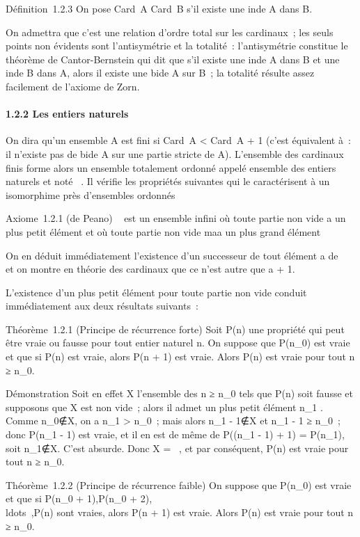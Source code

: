 \documentclass[]{article}
\begin{document}
Définition~1.2.3 On pose Card~A
\leq Card~B s'il existe une in\jmathection de A dans B.

On admettra que c'est une relation d'ordre total sur les cardinaux~; les
seuls points non évidents sont l'antisymétrie et la totalité~:
l'antisymétrie constitue le théorème de Cantor-Bernstein qui dit que
s'il existe une in\jmathection de A dans B et une in\jmathection de B dans A,
alors il existe une bi\jmathection de A sur B~; la totalité résulte assez
facilement de l'axiome de Zorn.

\paragraph{1.2.2 Les entiers naturels}

On dira qu'un ensemble A est fini si Card~A
\textless{} Card~A + 1 (c'est équivalent à~: il
n'existe pas de bi\jmathection de A sur une partie stricte de A). L'ensemble
des cardinaux finis forme alors un ensemble totalement ordonné appelé
ensemble des entiers naturels et noté ~. Il vérifie les propriétés
suivantes qui le caractérisent à un isomorphime près d'ensembles
ordonnés

Axiome~1.2.1 (de Peano) ~ est un ensemble infini où toute partie non
vide a un plus petit élément et où toute partie non vide ma a un
plus grand élément

On en déduit immédiatement l'existence d'un successeur de tout élément a
de ~ et on montre en théorie des cardinaux que ce n'est autre que a + 1.

L'existence d'un plus petit élément pour toute partie non vide conduit
immédiatement aux deux résultats suivants~:

Théorème~1.2.1 (Principe de récurrence forte) Soit P(n) une propriété
qui peut être vraie ou fausse pour tout entier naturel n. On suppose que
P(n\_0) est vraie et que si P(n) est vraie, alors P(n + 1) est
vraie. Alors P(n) est vraie pour tout n ≥ n\_0.

Démonstration Soit en effet X l'ensemble des n ≥ n\_0 tels que
P(n) soit fausse et supposons que X est non vide~; alors il admet un
plus petit élément n\_1 \inX. Comme
n\_0∉X, on a n\_1
\textgreater{} n\_0~; mais alors n\_1 -
1∉X et n\_1 - 1 ≥ n\_0~; donc
P(n\_1 - 1) est vraie, et il en est de même de P((n\_1 -
1) + 1) = P(n\_1), soit
n\_1∉X. C'est absurde. Donc X = \varnothing~, et
par conséquent, P(n) est vraie pour tout n ≥ n\_0.

Théorème~1.2.2 (Principe de récurrence faible) On suppose que
P(n\_0) est vraie et que si P(n\_0 + 1),P(n\_0 +
2),\\ldots~,P(n)
sont vraies, alors P(n + 1) est vraie. Alors P(n) est vraie pour tout n
≥ n\_0.
\end{document}
